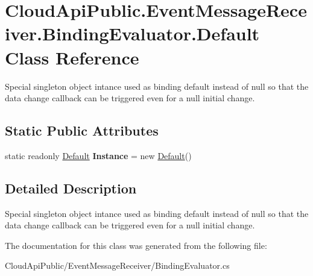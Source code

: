 \hypertarget{class_cloud_api_public_1_1_event_message_receiver_1_1_binding_evaluator_1_1_default}{\section{Cloud\-Api\-Public.\-Event\-Message\-Receiver.\-Binding\-Evaluator.\-Default Class Reference}
\label{class_cloud_api_public_1_1_event_message_receiver_1_1_binding_evaluator_1_1_default}
}


Special singleton object intance used as binding default instead of null so that the data change callback can be triggered even for a null initial change.  


\subsection*{Static Public Attributes}
\begin{DoxyCompactItemize}
\item 
\hypertarget{class_cloud_api_public_1_1_event_message_receiver_1_1_binding_evaluator_1_1_default_a0167c60f137087cb60ad6a186f325ae2}{static readonly \hyperlink{class_cloud_api_public_1_1_event_message_receiver_1_1_binding_evaluator_1_1_default}{Default} {\bfseries Instance} = new \hyperlink{class_cloud_api_public_1_1_event_message_receiver_1_1_binding_evaluator_1_1_default}{Default}()}\label{class_cloud_api_public_1_1_event_message_receiver_1_1_binding_evaluator_1_1_default_a0167c60f137087cb60ad6a186f325ae2}

\end{DoxyCompactItemize}


\subsection{Detailed Description}
Special singleton object intance used as binding default instead of null so that the data change callback can be triggered even for a null initial change. 



The documentation for this class was generated from the following file\-:\begin{DoxyCompactItemize}
\item 
Cloud\-Api\-Public/\-Event\-Message\-Receiver/Binding\-Evaluator.\-cs\end{DoxyCompactItemize}
